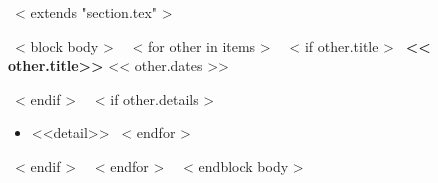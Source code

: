 ~< extends "section.tex" >~

~< block body >~
~< for other in items >~
  ~< if other.title >~
    \textbf{<< other.title>>}
    \hfill << other.dates >> \par
  ~< endif >~
  ~< if other.details >~
    \begin{itemize}
    ~< for detail in other.details ->~
        \item[\textbullet]{<<detail>>}
    ~< endfor >~
    \end{itemize}
  ~< endif >~
  \vspace{3mm}
~< endfor >~
\vspace{-3mm}
~< endblock body >~
